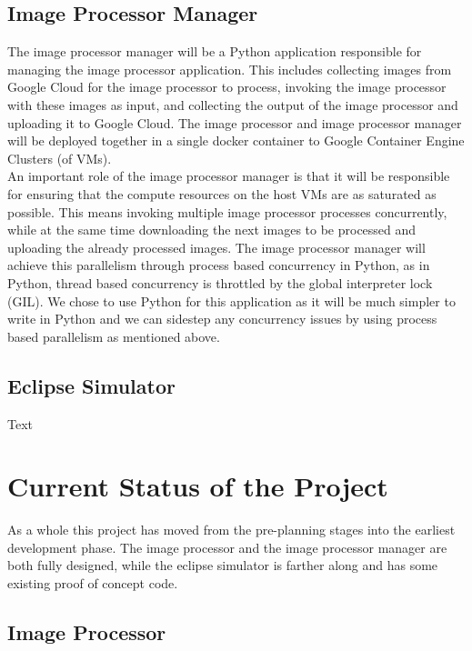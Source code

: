 \documentclass[10pt, onecolumn, draftclsnofoot, letterpaper, compsoc]{IEEEtran}
\begin{document}
\subsection{Image Processor Manager}

The image processor manager will be a Python application responsible for managing the image processor
application. This includes collecting images from Google Cloud for the image processor to process, 
invoking the image processor with these images as input, and collecting the output of the image 
processor and uploading it to Google Cloud. The image processor and image processor manager will be 
deployed together in a single docker container to Google Container Engine Clusters (of VMs). \\

An important role of the image processor manager is that it will be responsible for ensuring that 
the compute resources on the host VMs are as saturated as possible. This means invoking multiple 
image processor processes concurrently, while at the same time downloading the next images to be 
processed and uploading the already processed images. The image processor manager will achieve 
this parallelism through process based concurrency in Python, as in Python, thread based concurrency 
is throttled by the global interpreter lock (GIL). We chose to use Python for this application as it 
will be much simpler to write in Python and we can sidestep any concurrency issues by using process 
based parallelism as mentioned above. \\

\subsection{Eclipse Simulator}

Text


\section{Current Status of the Project}

As a whole this project has moved from the pre-planning stages into the earliest
development phase. The image processor and the image processor manager are both
fully designed, while the eclipse simulator is farther along and has some existing proof of
concept code.

\subsection{Image Processor}
\end{document}

